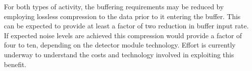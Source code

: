 For both types of activity, the buffering requirements may be reduced by employing lossless compression to the data prior to it entering the buffer.
This can be expected to provide at least a factor of two reduction in buffer input rate. 
If expected noise levels are achieved this compression would provide a factor of four to ten, depending on the detector module technology.
Effort is currently underway to understand the costs and technology involved in exploiting this benefit.







